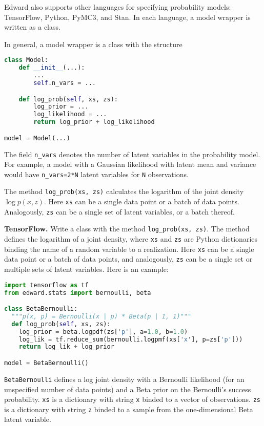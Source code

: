 Edward also supports other languages for specifying probability models:
TensorFlow, Python, PyMC3, and Stan.
In each language, a model wrapper is written as a class.

In general, a model wrapper is a class with the structure

\begin{lstlisting}[language=Python]
class Model:
    def __init__(...):
        ...
        self.n_vars = ...

    def log_prob(self, xs, zs):
        log_prior = ...
        log_likelihood = ...
        return log_prior + log_likelihood

model = Model(...)
\end{lstlisting}

The field \texttt{n_vars} denotes the number of latent variables in the
probability model. For example, a model with a Gaussian likelihood with latent
mean and variance would have \texttt{n_vars=2*N} latent variables for
\texttt{N} observations.

The method \texttt{log_prob(xs, zs)} calculates the logarithm of
the joint density $\log p(x,z)$. Here \texttt{xs} can be a single data
point or a batch of data points. Analogously, \texttt{zs} can be a
single set of latent variables, or a batch thereof.

\textbf{TensorFlow.}
Write a class with the method \texttt{log_prob(xs, zs)}. The method defines
the logarithm of a joint density, where \texttt{xs} and \texttt{zs} are Python
dictionaries binding the name of a random variable to
a realization.
Here \texttt{xs} can be a single data
point or a batch of data points, and analogously, \texttt{zs} can be a
single set or multiple sets of latent variables.
Here is an example:

\begin{lstlisting}[language=Python]
import tensorflow as tf
from edward.stats import bernoulli, beta

class BetaBernoulli:
  """p(x, p) = Bernoulli(x | p) * Beta(p | 1, 1)"""
  def log_prob(self, xs, zs):
    log_prior = beta.logpdf(zs['p'], a=1.0, b=1.0)
    log_lik = tf.reduce_sum(bernoulli.logpmf(xs['x'], p=zs['p']))
    return log_lik + log_prior

model = BetaBernoulli()
\end{lstlisting}

\texttt{BetaBernoulli} defines a log joint density with a Bernoulli
likelihood (for an unspecified number of data points) and a Beta prior
on the Bernoulli's success probability.
\texttt{xs} is a dictionary with string \texttt{x} binded to a vector of
observations. \texttt{zs} is a dictionary with string \texttt{z} binded to a
sample from the one-dimensional Beta latent variable.

